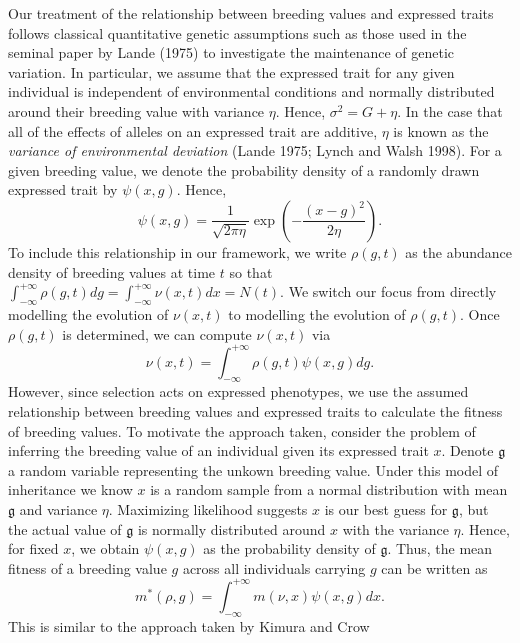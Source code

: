 \documentclass[]{article}
\begin{document}
Our treatment of the relationship between breeding values and expressed
traits follows classical quantitative genetic assumptions such as those
used in the seminal paper by Lande (1975) to investigate the maintenance
of genetic variation. In particular, we assume that the expressed trait
for any given individual is independent of environmental conditions and
normally distributed around their breeding value with variance \(\eta\).
Hence, \(\sigma^2=G+\eta\). In the case that all of the effects of
alleles on an expressed trait are additive, \(\eta\) is known as the
\emph{variance of environmental deviation} (Lande 1975; Lynch and Walsh
1998). For a given breeding value, we denote the probability density of
a randomly drawn expressed trait by \(\psi(x,g)\). Hence,
\begin{equation}
\psi(x,g)=\frac{1}{\sqrt{2\pi\eta}}\exp\left(-\frac{(x-g)^2}{2\eta}\right).
\end{equation} To include this relationship in our framework, we write
\(\rho(g,t)\) as the abundance density of breeding values at time \(t\)
so that
\(\int_{-\infty}^{+\infty}\rho(g,t)dg=\int_{-\infty}^{+\infty}\nu(x,t)dx=N(t)\).
We switch our focus from directly modelling the evolution of
\(\nu(x,t)\) to modelling the evolution of \(\rho(g,t)\). Once
\(\rho(g,t)\) is determined, we can compute \(\nu(x,t)\) via
\begin{equation}\label{nu_from_rho}
\nu(x,t)=\int_{-\infty}^{+\infty}\rho(g,t)\psi(x,g)dg.
\end{equation} However, since selection acts on expressed phenotypes, we
use the assumed relationship between breeding values and expressed
traits to calculate the fitness of breeding values. To motivate the
approach taken, consider the problem of inferring the breeding value of
an individual given its expressed trait \(x\). Denote \(\mathfrak{g}\) a
random variable representing the unkown breeding value. Under this model
of inheritance we know \(x\) is a random sample from a normal
distribution with mean \(\mathfrak{g}\) and variance \(\eta\).
Maximizing likelihood suggests \(x\) is our best guess for
\(\mathfrak{g}\), but the actual value of \(\mathfrak{g}\) is normally
distributed around \(x\) with the variance \(\eta\). Hence, for fixed
\(x\), we obtain \(\psi(x,g)\) as the probability density of
\(\mathfrak{g}\). Thus, the mean fitness of a breeding value \(g\)
across all individuals carrying \(g\) can be written as
\begin{equation}\label{m_rel}
m^*(\rho,g)=\int_{-\infty}^{+\infty}m(\nu,x)\psi(x,g)dx.
\end{equation} This is similar to the approach taken by Kimura and Crow
\end{document}
